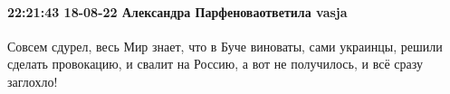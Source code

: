  
 
 
 
 

\paragraph{22:21:43 18-08-22 Александра Парфеноваответила vasja}

Совсем сдурел, весь Мир знает, что в Буче виноваты, сами украинцы, решили
сделать провокацию, и свалит на Россию, а вот не получилось, и всё сразу
заглохло!
